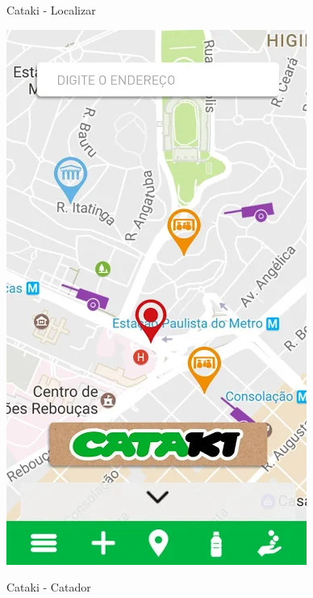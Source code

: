 \documentclass[
	12pt,				%
	openany,			%
	twoside,			%
	a4paper,			%
	english,			%
	french,				%
	spanish,			%
	brazil				%
	]{abntex2}
\begin{document}
    \begin{figure}[htb]    
 \centering
  \begin{minipage}{0.45\textwidth}
    \centering
    \caption{Cataki - Localizar}
    \includegraphics[scale=0.45]{media/catakimap.png}
     \label{fig:figura1}
  \end{minipage}
  \hfill
  \begin{minipage}{0.45\textwidth}
    \centering
    \caption{Cataki - Catador}

\end{minipage}
\end{figure}
\end{document}
